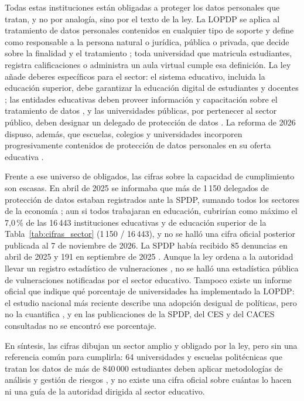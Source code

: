 Todas estas instituciones están obligadas a proteger los datos personales que tratan, y no por analogía, sino por el texto de la ley. La LOPDP se aplica al tratamiento de datos personales contenidos en cualquier tipo de soporte \cite[art.~2]{lopdp2021} y define como responsable a la persona natural o jurídica, pública o privada, que decide sobre la finalidad y el tratamiento \cite[art.~4]{lopdp2021}; toda universidad que matricula estudiantes, registra calificaciones o administra un aula virtual cumple esa definición. La ley añade deberes específicos para el sector: el sistema educativo, incluida la educación superior, debe garantizar la educación digital de estudiantes y docentes \cite[art.~23]{lopdp2021}; las entidades educativas deben proveer información y capacitación sobre el tratamiento de datos \cite[art.~24]{lopdp2021}, y las universidades públicas, por pertenecer al sector público, deben designar un delegado de protección de datos \cite[art.~48, num.~1]{lopdp2021}. La reforma de 2026 dispuso, además, que escuelas, colegios y universidades incorporen progresivamente contenidos de protección de datos personales en su oferta educativa \cite[art.~8]{lofc2026}.

Frente a ese universo de obligados, las cifras sobre la capacidad de cumplimiento son escasas. En abril de 2025 se informaba que más de 1\,150 delegados de protección de datos estaban registrados ante la SPDP, sumando todos los sectores de la economía \cite{itahora2025spdp}; aun si todos trabajaran en educación, cubrirían como máximo el 7,0\,\% de las 16\,443 instituciones educativas y de educación superior de la Tabla~\ref{tab:cifras_sector} (1\,150 / 16\,443), y no se halló una cifra oficial posterior publicada al 7 de noviembre de 2026. La SPDP había recibido 85 denuncias en abril de 2025 \cite{itahora2025spdp} y 191 en septiembre de 2025 \cite{almeida2025cero}. Aunque la ley ordena a la autoridad llevar un registro estadístico de vulneraciones \cite[art.~76, num.~14]{lopdp2021}, no se halló una estadística pública de vulneraciones notificadas por el sector educativo. Tampoco existe un informe oficial que indique qué porcentaje de universidades ha implementado la LOPDP: el estudio nacional más reciente describe una adopción desigual de políticas, pero no la cuantifica \cite{piray2026garantias}, y en las publicaciones de la SPDP, del CES y del CACES consultadas no se encontró ese porcentaje.

En síntesis, las cifras dibujan un sector amplio y obligado por la ley, pero sin una referencia común para cumplirla: 64 universidades y escuelas politécnicas que tratan los datos de más de 840\,000 estudiantes deben aplicar metodologías de análisis y gestión de riesgos \cite[art.~47, num.~5]{lopdp2021}, y no existe una cifra oficial sobre cuántas lo hacen ni una guía de la autoridad dirigida al sector educativo.

